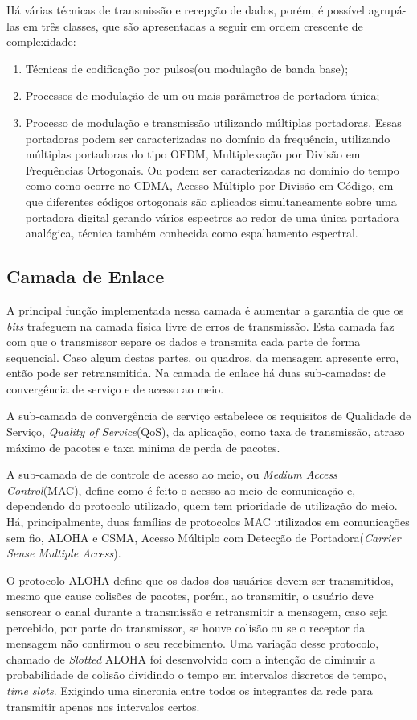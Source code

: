 Há várias técnicas de transmissão e recepção de dados, porém, é possível agrupá-las em três classes, que são apresentadas a seguir em ordem crescente de complexidade:
\begin{enumerate}
      \item Técnicas de codificação por pulsos(ou modulação de banda base);
      \item Processos de modulação de um ou mais parâmetros de portadora única;
      \item Processo de modulação e transmissão utilizando múltiplas portadoras. Essas portadoras podem ser caracterizadas no domínio da frequência, utilizando múltiplas portadoras do tipo OFDM, Multiplexação por Divisão em Frequências Ortogonais. Ou podem ser caracterizadas no domínio do tempo como como ocorre no CDMA, Acesso Múltiplo por Divisão em Código, em que diferentes códigos ortogonais são aplicados simultaneamente sobre uma portadora digital gerando vários espectros ao redor de uma única portadora analógica, técnica também conhecida como espalhamento espectral.
\end{enumerate}

\subsection{Camada de Enlace}
A principal função implementada nessa camada é aumentar a garantia de que os \emph{bits} trafeguem na camada física livre de erros de transmissão. Esta camada faz com que o transmissor separe os dados e transmita cada parte de forma sequencial. Caso algum destas partes, ou quadros, da mensagem apresente erro, então pode ser retransmitida. Na camada de enlace há duas sub-camadas: de convergência de serviço e de acesso ao meio.

A sub-camada de convergência de serviço estabelece os requisitos de Qualidade de Serviço, \emph{Quality of Service}(QoS), da aplicação, como taxa de transmissão, atraso máximo de pacotes e taxa minima de perda de pacotes.

A sub-camada de de controle de acesso ao meio, ou \emph{Medium Access Control}(MAC), define como é feito o acesso ao meio de comunicação e, dependendo do protocolo utilizado, quem tem prioridade de utilização do meio. Há, principalmente, duas famílias de protocolos MAC utilizados em comunicações sem fio, ALOHA e CSMA, Acesso Múltiplo com Detecção de Portadora(\emph{Carrier Sense Multiple Access}).

O protocolo ALOHA define que os dados dos usuários devem ser transmitidos, mesmo que cause colisões de pacotes, porém, ao transmitir, o usuário deve sensorear o canal durante a transmissão e retransmitir a mensagem, caso seja percebido, por parte do transmissor, se houve colisão ou se o receptor da mensagem não confirmou o seu recebimento. Uma variação desse protocolo, chamado de \emph{Slotted} ALOHA foi desenvolvido com a intenção de diminuir a probabilidade de colisão dividindo o tempo em intervalos discretos de tempo, \emph{time slots}. Exigindo uma sincronia entre todos os integrantes da rede para transmitir apenas nos intervalos certos.

